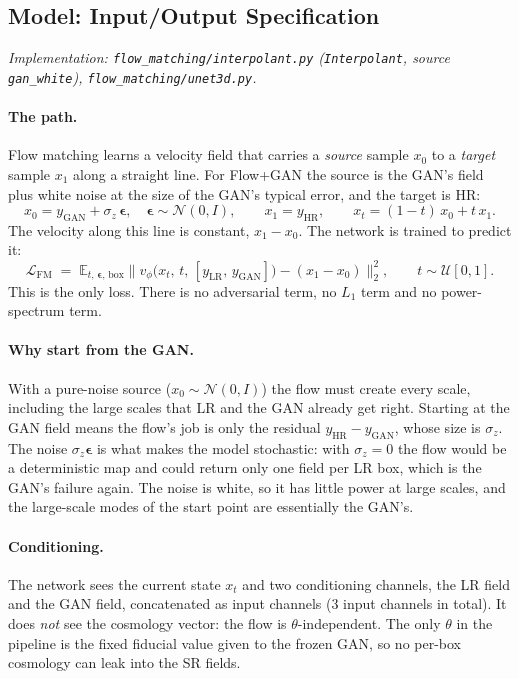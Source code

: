 \subsection{Model: Input/Output Specification}
\textit{Implementation: \texttt{flow\_matching/interpolant.py}
(\texttt{Interpolant}, source \texttt{gan\_white}),
\texttt{flow\_matching/unet3d.py}.}

\paragraph{The path.} Flow matching learns a velocity field that carries a
\emph{source} sample $x_0$ to a \emph{target} sample $x_1$ along a straight line.
For Flow+GAN the source is the GAN's field plus white noise at the size of the
GAN's typical error, and the target is HR:
\begin{equation}
  x_0 = y_\text{GAN} + \sigma_z\,\boldsymbol\epsilon,\quad
  \boldsymbol\epsilon\sim\mathcal N(0,I), \qquad
  x_1 = y_\text{HR}, \qquad
  x_t = (1-t)\,x_0 + t\,x_1 .
  \label{eq:fg-path}
\end{equation}
The velocity along this line is constant, $x_1-x_0$. The network is trained to
predict it:
\begin{equation}
  \mathcal L_\text{FM} \;=\; \mathbb E_{t,\,\boldsymbol\epsilon,\,\text{box}}
    \big\lVert v_\phi\big(x_t,\,t,\,[y_\text{LR},\,y_\text{GAN}]\big) - (x_1 - x_0)\big\rVert_2^2 ,
  \qquad t\sim\mathcal U[0,1].
  \label{eq:fg-loss}
\end{equation}
This is the only loss. There is no adversarial term, no $L_1$ term and no
power-spectrum term.

\paragraph{Why start from the GAN.} With a pure-noise source ($x_0\sim\mathcal
N(0,I)$) the flow must create every scale, including the large scales that LR
and the GAN already get right. Starting at the GAN field means the flow's job is
only the residual $y_\text{HR}-y_\text{GAN}$, whose size is $\sigma_z$. The noise
$\sigma_z\boldsymbol\epsilon$ is what makes the model stochastic: with
$\sigma_z=0$ the flow would be a deterministic map and could return only one
field per LR box, which is the GAN's failure again. The noise is white, so it
has little power at large scales, and the large-scale modes of the start point
are essentially the GAN's.

\paragraph{Conditioning.} The network sees the current state $x_t$ and two
conditioning channels, the LR field and the GAN field, concatenated as input
channels ($3$ input channels in total). It does \emph{not} see the cosmology
vector: the flow is $\theta$-independent. The only $\theta$ in the pipeline is
the fixed fiducial value given to the frozen GAN, so no per-box cosmology can
leak into the SR fields.

